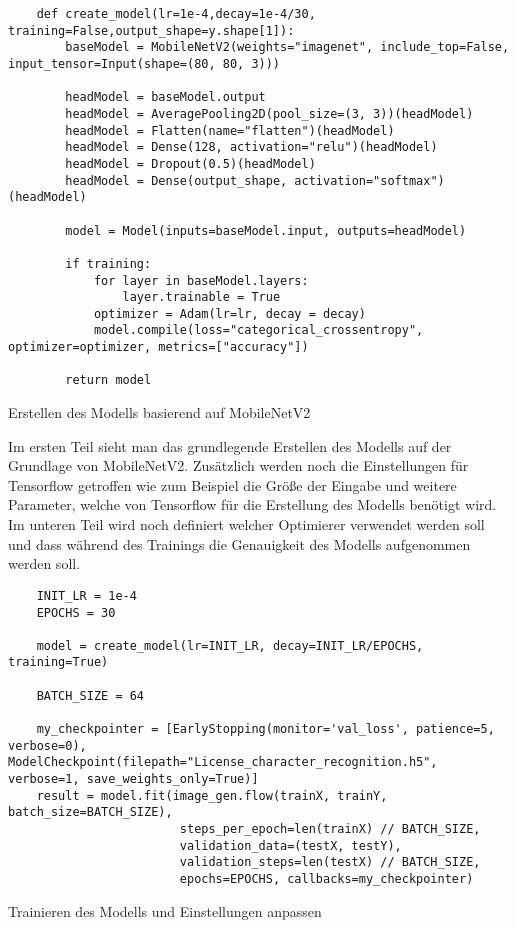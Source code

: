\begin{longlisting}
    \begin{verbatim}
    def create_model(lr=1e-4,decay=1e-4/30, training=False,output_shape=y.shape[1]):
        baseModel = MobileNetV2(weights="imagenet", include_top=False, input_tensor=Input(shape=(80, 80, 3)))

        headModel = baseModel.output
        headModel = AveragePooling2D(pool_size=(3, 3))(headModel)
        headModel = Flatten(name="flatten")(headModel)
        headModel = Dense(128, activation="relu")(headModel)
        headModel = Dropout(0.5)(headModel)
        headModel = Dense(output_shape, activation="softmax")(headModel)

        model = Model(inputs=baseModel.input, outputs=headModel)

        if training:
            for layer in baseModel.layers:
                layer.trainable = True
            optimizer = Adam(lr=lr, decay = decay)
            model.compile(loss="categorical_crossentropy", optimizer=optimizer, metrics=["accuracy"])
    
        return model
    \end{verbatim}
    \caption{Erstellen des Modells basierend auf MobileNetV2}
\end{longlisting}

Im ersten Teil sieht man das grundlegende Erstellen des Modells auf der Grundlage von MobileNetV2. Zusätzlich werden noch die Einstellungen für 
Tensorflow getroffen wie zum Beispiel die Größe der Eingabe und weitere Parameter, welche von Tensorflow für die Erstellung des Modells benötigt wird. 
Im unteren Teil wird noch definiert welcher Optimierer verwendet werden soll und dass während des Trainings die Genauigkeit des Modells aufgenommen werden soll.

\begin{longlisting}
    \begin{verbatim}
    INIT_LR = 1e-4
    EPOCHS = 30

    model = create_model(lr=INIT_LR, decay=INIT_LR/EPOCHS, training=True)

    BATCH_SIZE = 64

    my_checkpointer = [EarlyStopping(monitor='val_loss', patience=5, verbose=0), ModelCheckpoint(filepath="License_character_recognition.h5", verbose=1, save_weights_only=True)]
    result = model.fit(image_gen.flow(trainX, trainY, batch_size=BATCH_SIZE), 
                        steps_per_epoch=len(trainX) // BATCH_SIZE, 
                        validation_data=(testX, testY), 
                        validation_steps=len(testX) // BATCH_SIZE, 
                        epochs=EPOCHS, callbacks=my_checkpointer)
    \end{verbatim}
    \caption{Trainieren des Modells und Einstellungen anpassen}
\end{longlisting}

